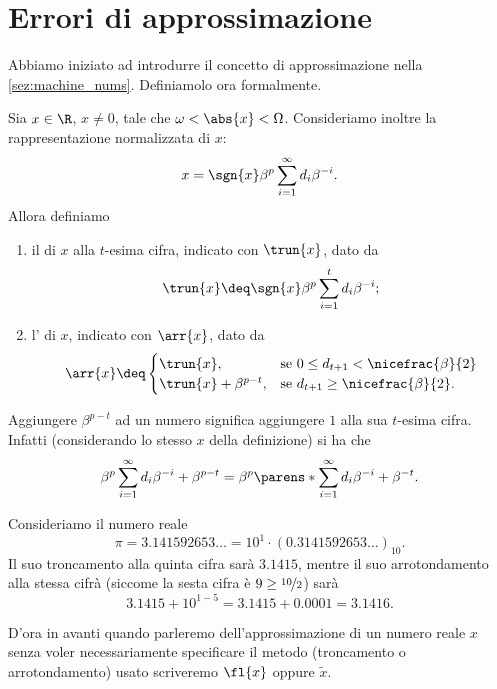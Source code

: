 \section{Errori di approssimazione}

Abbiamo iniziato ad introdurre il concetto di approssimazione nella \autoref{sez:machine_nums}. Definiamolo ora formalmente.

\begin{definition}
     Sia $x \in \R$, $x \neq 0$, tale che $\omega < \abs{x} < \Omega$. Consideriamo inoltre la rappresentazione normalizzata di $x$: \[
        x = \sgn{x}\beta^p\sum_{i=1}^{\infty} d_i\beta^{-i}.
    \] 
    Allora definiamo \begin{enumerate}[(1)]
        \item il  di $x$ alla $t$-esima cifra, indicato con $\trun{x}$, dato da \[
            \trun{x} \deq \sgn{x}\beta^p\sum_{i=1}^t d_i\beta^{-i};
        \]
        \item l' di $x$, indicato con $\arr{x}$, dato da \[
            \arr{x} \deq \begin{cases}
                \trun{x}, &\text{se } 0 \leq d_{t+1} < \nicefrac{\beta}{2}\\
                \trun{x} + \beta^{p-t}, &\text{se } d_{t+1} \geq \nicefrac{\beta}{2}.
            \end{cases}
        \] 
    \end{enumerate} 
\end{definition}

\begin{remark}
    Aggiungere $\beta^{p-t}$ ad un numero significa aggiungere $1$ alla sua $t$-esima cifra. Infatti (considerando lo stesso $x$ della definizione) si ha che \[
        \beta^p\sum_{i=1}^\infty d_i\beta^{-i} + \beta^{p-t} = \beta^p\parens*{\sum_{i=1}^\infty d_i\beta^{-i} + \beta^{-t}}.    
    \] 
\end{remark}

\begin{example}
    Consideriamo il numero reale \[
        \pi = 3.141592653\dots = 10^1 \cdot (0.3141592653\dots)_{10}.
    \] Il suo troncamento alla quinta cifra sarà $3.1415$, mentre il suo arrotondamento alla stessa cifrà (siccome la sesta cifra è $9 \geq \nicefrac{10}{2}$) sarà \[
        3.1415 + 10^{1 - 5} = 3.1415 + 0.0001 = 3.1416.
    \]
\end{example}

D'ora in avanti quando parleremo dell'approssimazione di un numero reale $x$ senza voler necessariamente specificare il metodo (troncamento o arrotondamento) usato scriveremo $\fl{x}$ oppure $\tilde{x}$.  

